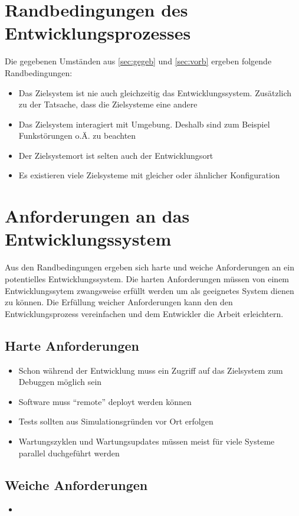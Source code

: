 \section{Randbedingungen des Entwicklungsprozesses}
Die gegebenen Umständen aus \autoref{sec:gegeb} und \autoref{sec:vorb} ergeben
folgende Randbedingungen:
\begin{itemize}
  \item Das Zielsystem ist nie auch gleichzeitig das Entwicklungssystem.
  Zusätzlich zu der Tatsache, dass die Zielsysteme eine andere
  \item Das Zielsystem interagiert mit Umgebung. Deshalb sind zum Beispiel
  Funkstörungen o.Ä. zu beachten
  \item Der Zielsystemort ist selten auch der Entwicklungsort
  \item Es existieren viele Zielsysteme mit gleicher oder ähnlicher
  Konfiguration
\end{itemize}

\section{Anforderungen an das Entwicklungssystem}
Aus den Randbedingungen ergeben sich harte und weiche Anforderungen an ein
potentielles Entwicklungssystem. Die harten Anforderungen müssen von einem
Entwicklungssytem zwangsweise erfüllt werden um als geeignetes System dienen zu
können. Die Erfüllung weicher Anforderungen kann den den
Entwicklungsprozess vereinfachen und dem Entwickler die Arbeit erleichtern.
\subsection{Harte Anforderungen}
\begin{itemize}
  \item Schon während der Entwicklung muss ein Zugriff auf das Zielsystem zum
  Debuggen möglich sein
  \item Software muss "`remote"' deployt werden können
  \item Tests sollten aus Simulationsgründen vor Ort erfolgen
  \item Wartungszyklen und Wartungsupdates müssen meist für viele Systeme
  parallel duchgeführt werden
\end{itemize}
\subsection{Weiche Anforderungen}
\begin{itemize}
  \item 
\end{itemize}


